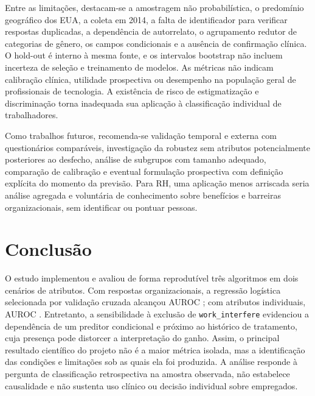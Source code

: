 \documentclass[11pt,a4paper]{article}
\begin{document}
Entre as limitações, destacam-se a amostragem não probabilística, o predomínio geográfico dos EUA, a coleta em 2014, a falta de identificador para verificar respostas duplicadas, a dependência de autorrelato, o agrupamento redutor de categorias de gênero, os campos condicionais e a ausência de confirmação clínica. O hold-out é interno à mesma fonte, e os intervalos bootstrap não incluem incerteza de seleção e treinamento de modelos. As métricas não indicam calibração clínica, utilidade prospectiva ou desempenho na população geral de profissionais de tecnologia. A existência de risco de estigmatização e discriminação torna inadequada sua aplicação à classificação individual de trabalhadores.

Como trabalhos futuros, recomenda-se validação temporal e externa com questionários comparáveis, investigação da robustez sem atributos potencialmente posteriores ao desfecho, análise de subgrupos com tamanho adequado, comparação de calibração e eventual formulação prospectiva com definição explícita do momento da previsão. Para RH, uma aplicação menos arriscada seria análise agregada e voluntária de conhecimento sobre benefícios e barreiras organizacionais, sem identificar ou pontuar pessoas.

\section{Conclusão}\label{sec:conclusao}

O estudo implementou e avaliou de forma reprodutível três algoritmos em dois cenários de atributos. Com respostas organizacionais, a regressão logística selecionada por validação cruzada alcançou AUROC \aucA; com atributos individuais, AUROC \aucB. Entretanto, a sensibilidade à exclusão de \texttt{work\_interfere} evidenciou a dependência de um preditor condicional e próximo ao histórico de tratamento, cuja presença pode distorcer a interpretação do ganho. Assim, o principal resultado científico do projeto não é a maior métrica isolada, mas a identificação das condições e limitações sob as quais ela foi produzida. A análise responde à pergunta de classificação retrospectiva na amostra observada, não estabelece causalidade e não sustenta uso clínico ou decisão individual sobre empregados.


\end{document}
